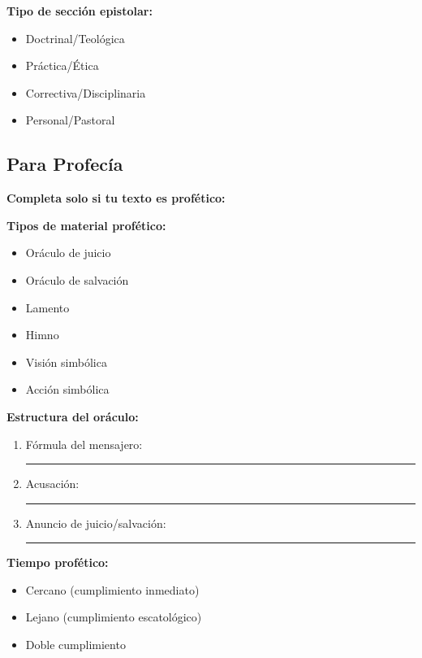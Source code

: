 \documentclass[11pt,a4paper]{article}
\begin{document}
\textbf{Tipo de sección epistolar:}
\begin{itemize}[leftmargin=1cm]
    \item[$\square$] Doctrinal/Teológica
    \item[$\square$] Práctica/Ética
    \item[$\square$] Correctiva/Disciplinaria
    \item[$\square$] Personal/Pastoral
\end{itemize}

\newpage

\subsection{Para Profecía}

\begin{literarybox}
\textbf{Completa solo si tu texto es profético:}
\end{literarybox}

\textbf{Tipos de material profético:}
\begin{itemize}[leftmargin=1cm]
    \item[$\square$] Oráculo de juicio
    \item[$\square$] Oráculo de salvación
    \item[$\square$] Lamento
    \item[$\square$] Himno
    \item[$\square$] Visión simbólica
    \item[$\square$] Acción simbólica
\end{itemize}

\textbf{Estructura del oráculo:}
\begin{enumerate}[leftmargin=1cm]
    \item Fórmula del mensajero: \rule{8cm}{0.4pt}
    \item Acusación: \rule{8cm}{0.4pt}
    \item Anuncio de juicio/salvación: \rule{8cm}{0.4pt}
\end{enumerate}

\textbf{Tiempo profético:}
\begin{itemize}[leftmargin=1cm]
    \item[$\square$] Cercano (cumplimiento inmediato)
    \item[$\square$] Lejano (cumplimiento escatológico)
    \item[$\square$] Doble cumplimiento
\end{itemize}
\end{document}
